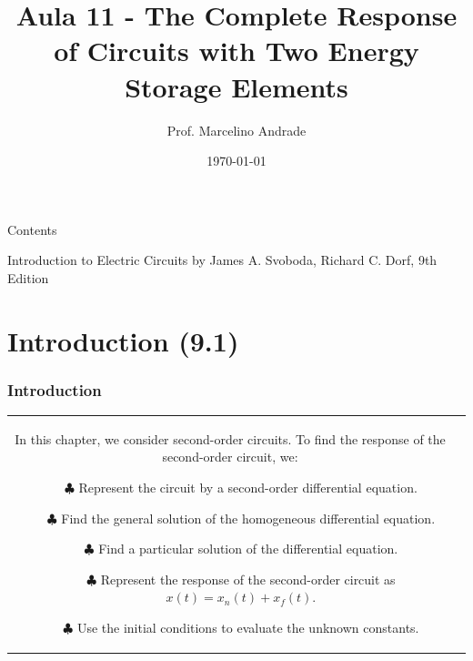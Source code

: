\documentclass[aspectratio=169]{beamer}
\title[\sc{Teoria de Circuitos Eletrônicos 1}]{\LARGE Aula 11 - The Complete Response of Circuits
with Two Energy Storage Elements}
\author[Prof. Marcelino Andrade]{Prof. Marcelino Andrade}
\institute{Faculdade UnB Gama} %
\date{\today}
\begin{document}
\justifying %
\pagebreak

\begin{frame}
  \titlepage
\end{frame}


\begin{frame}{Contents}

\tableofcontents
     		Introduction to Electric Circuits by James A. Svoboda, Richard C. Dorf, 9th Edition 
\end{frame}

\section{Introduction (9.1)}
\begin{frame}[fragile]
	\frametitle{Introduction}
		\begin{tabular}{cc}
			\begin{columns}
				\begin{column}{1\textwidth}  %
					In this chapter, we consider second-order circuits. To find the response of the second-order circuit, we:	
		
\footnotesize		\begin{itemize}
						\item[$\clubsuit$]{Represent the circuit by a second-order differential equation.\newline}
						\item[$\clubsuit$]{Find the general solution of the homogeneous differential equation.\newline}
						\item[$\clubsuit$]{Find a particular solution of the differential equation.\newline}	
						\item[$\clubsuit$]{Represent the response of the second-order circuit as $x(t)=x_n(t)+ x_f(t)$.\newline}	
						\item[$\clubsuit$]{Use the initial conditions to evaluate the unknown constants.\newline}	
					\end{itemize}
					
				\end{column}
			\end{columns}
		
	\end{tabular}
\end{frame}
\end{document}
